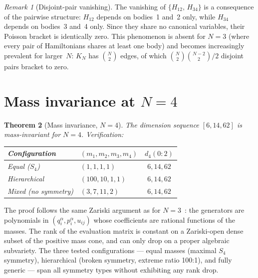 \documentclass[11pt,a4paper]{article}
\newtheorem{theorem}{Theorem}
\theoremstyle{remark}
\newtheorem{remark}[theorem]{Remark}
\newcommand{\pb}[2]{\{#1,\,#2\}}
\begin{document}
\begin{remark}[Disjoint-pair vanishing]
The vanishing of $\pb{H_{12}}{H_{34}}$ is a consequence
of the pairwise structure: $H_{12}$ depends on bodies~1
and~2 only, while $H_{34}$ depends on bodies~3 and~4
only.  Since they share no canonical variables, their
Poisson bracket is identically zero.  This phenomenon is
absent for $N{=}3$ (where every pair of Hamiltonians
shares at least one body) and becomes increasingly
prevalent for larger~$N$: $K_N$ has $\binom{N}{2}$
edges, of which $\binom{N}{2}\binom{N-2}{2}/2$ disjoint
pairs bracket to zero.
\end{remark}


\section{Mass invariance at $N{=}4$}
\label{sec:mass}

\begin{theorem}[Mass invariance, $N{=}4$]
\label{thm:mass-n4}
The dimension sequence $[6, 14, 62]$ is mass-invariant
for $N{=}4$.  Verification:
\begin{center}
\begin{tabular}{@{}llc@{}}
\toprule
Configuration & $(m_1, m_2, m_3, m_4)$
  & $d_4(0{:}2)$ \\
\midrule
Equal ($S_4$) & $(1, 1, 1, 1)$ & $6, 14, 62$ \\
Hierarchical & $(100, 10, 1, 1)$ & $6, 14, 62$ \\
Mixed (no symmetry) & $(3, 7, 11, 2)$ & $6, 14, 62$ \\
\bottomrule
\end{tabular}
\end{center}
\end{theorem}

The proof follows the same Zariski argument as for
$N{=}3$~\cite{paper1}: the generators are polynomials in
$(q_i^\alpha, p_i^\alpha, u_{ij})$ whose coefficients are
rational functions of the masses.  The rank of the
evaluation matrix is constant on a Zariski-open dense
subset of the positive mass cone, and can only drop on a
proper algebraic subvariety.  The three tested
configurations --- equal masses (maximal $S_4$ symmetry),
hierarchical (broken symmetry, extreme ratio 100:1), and
fully generic --- span all symmetry types without
exhibiting any rank drop.
\end{document}
